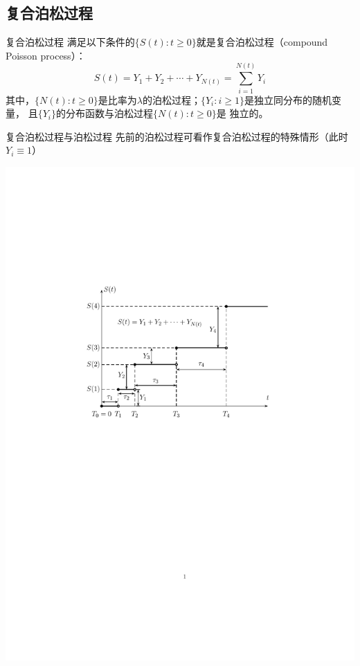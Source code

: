 \documentclass[t]{beamer}
\begin{document}
\subsection{复合泊松过程}
\begin{frame}{复合泊松过程}
    满足以下条件的$\{S(t):t\ge0\}$就是复合泊松过程（compound Poisson process）：
\[S(t)=Y_1+Y_2+\cdots +Y_{N(t)}=\sum^{N(t)}_{i=1}Y_i \]
其中，$\{N(t):t\ge0\}$是比率为$\lambda$的泊松过程；$\{Y_i:i\ge1\}$是独立同分布的随机变量，
且$\{Y_i\}$的分布函数与泊松过程$\{N(t):t\ge0\}$是 独立的。	
\end{frame}


\begin{frame}{复合泊松过程与泊松过程}
    先前的泊松过程可看作复合泊松过程的特殊情形（此时$Y_i\equiv 1$）
 \begin{center}
    \includegraphics[scale=.82]{fig/poisson_comp.pdf}
 \end{center}
\end{frame}
\end{document}
